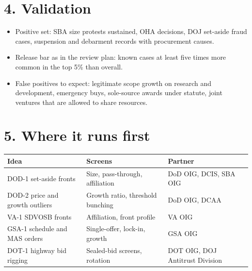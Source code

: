 \documentclass[letterpaper,11pt]{article}
\providecommand{\tightlist}{\setlength{\itemsep}{0pt}\setlength{\parskip}{0pt}}
\begin{document}
\hypertarget{validation}{%
\section*{4. Validation}\label{validation}}

\begin{itemize}
\tightlist
\item
  Positive set: SBA size protests sustained, OHA decisions, DOJ
  set-aside fraud cases, suspension and debarment records with
  procurement causes.
\item
  Release bar as in the review plan: known cases at least five times
  more common in the top 5\% than overall.
\item
  False positives to expect: legitimate scope growth on research and
  development, emergency buys, sole-source awards under statute, joint
  ventures that are allowed to share resources.
\end{itemize}

\hypertarget{where-it-runs-first}{%
\section*{5. Where it runs first}\label{where-it-runs-first}}

\begingroup\small\setlength{\tabcolsep}{4pt}\renewcommand{\arraystretch}{1.25}
\begin{longtable}[l]{@{}>{\raggedright\arraybackslash}p{}>{\raggedright\arraybackslash}p{}>{\raggedright\arraybackslash}p{}@{}}
\rowcolor{coolblack}\leavevmode\color{white}\bfseries Idea & \leavevmode\color{white}\bfseries Screens & \leavevmode\color{white}\bfseries Partner \\
\endhead
DOD-1 set-aside fronts & Size, pass-through, affiliation & DoD OIG, DCIS, SBA OIG \\
DOD-2 price and growth outliers & Growth ratio, threshold bunching & DoD OIG, DCAA \\
VA-1 SDVOSB fronts & Affiliation, front profile & VA OIG \\
GSA-1 schedule and MAS orders & Single-offer, lock-in, growth & GSA OIG \\
DOT-1 highway bid rigging & Sealed-bid screens, rotation & DOT OIG, DOJ Antitrust Division \\
\end{longtable}\endgroup
\end{document}
